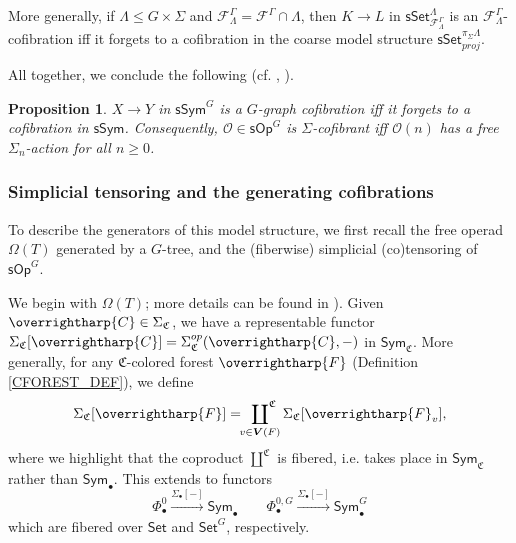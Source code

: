 \documentclass[a4paper,10pt
,draft
]{article}%
\numberwithin{equation}{section}
\numberwithin{figure}{section}
\newtheorem{proposition}[equation]{Proposition}%
\theoremstyle{definition} %
\newcommand{\vect}[1]{\text{\overrightharp{\ensuremath{#1}}}}
\newcommand{\Sym}{\ensuremath{\mathsf{Sym}}}%
\newcommand{\Set}{\ensuremath{\mathsf{Set}}}
\newcommand{\sSet}{\ensuremath{\mathsf{sSet}}}%
\newcommand{\Op}{\mathsf{Op}}%
\newcommand{\sOp}{\ensuremath{\mathsf{sOp}}}%
\newcommand{\F}{\ensuremath{\mathcal F}}
\renewcommand{\O}{\ensuremath{\mathcal O}}
\renewcommand{\P}{\ensuremath{\mathcal P}}
\newcommand{\1}{\ensuremath{\mathbbm 1}}%
\begin{document}
More generally, if $\Lambda \leq G \times \Sigma$ and $\F^\Gamma_{\Lambda} = \F^\Gamma \cap \Lambda$,
then $K \to L$ in $\sSet^{\Lambda}_{\F^\Gamma_\Lambda}$ is an $\F^\Gamma_\Lambda$-cofibration
iff
it forgets to a cofibration in the coarse model structure $\sSet^{\pi_{\Sigma}\Lambda}_{proj}$.
      
All together, we conclude the following (cf. \cite[Remark 6.7]{Per18}, \cite[discussion before Thm. 2.31]{BP_edss}).

\begin{proposition}
      \label{SGS_COF_PROP}
      $X \to Y$ in $\mathsf{sSym}^G$ is a $G$-graph cofibration iff
      it forgets to a cofibration in $\mathsf{sSym}$.
      Consequently, $\O \in \sOp^G$ is $\Sigma$-cofibrant iff $\O(n)$ has a free $\Sigma_n$-action for all $n \geq 0$.
\end{proposition}

\subsubsection{Simplicial tensoring and the generating cofibrations}

To describe the generators of this model structure, we first recall
the free operad $\Omega(T)$ generated by a $G$-tree, and
the (fiberwise) simplicial (co)tensoring of $\sOp^G$.









We begin with $\Omega(T)$; more details can be found in \cite[\S 2.3.1 and \S 4.2]{BP_HGOP}). %
Given $\vect C \in \Sigma_{\mathfrak C}$, we have a representable functor $\Sigma_{\mathfrak C}[\vect C] = \Sigma_{\mathfrak C}^{op}(\vect C, -)$ in $\Sym_{\mathfrak C}$.
More generally, for any $\mathfrak C$-colored forest $\vect F$ (Definition \ref{CFOREST_DEF}), we define
\[
      \Sigma_{\mathfrak C}[\vect F] = \sideset{}{^{\mathfrak C}}\coprod_{v \in \boldsymbol{V}(F)} \Sigma_{\mathfrak C}[\vect F_v],
\]
where we highlight that the coproduct $\amalg^{\mathfrak C}$ is fibered, i.e. takes place in $\Sym_{\mathfrak C}$ rather than $\Sym_\bullet$.
This extends to functors
\[
      \Phi_\bullet^0 \xrightarrow{\Sigma_\bullet[-]} \Sym_\bullet
      \qquad
      \Phi_\bullet^{0,G} \xrightarrow{\Sigma_\bullet[-]} \Sym_\bullet^G
\]
which are fibered over $\Set$ and $\Set^G$, respectively.
\end{document}
